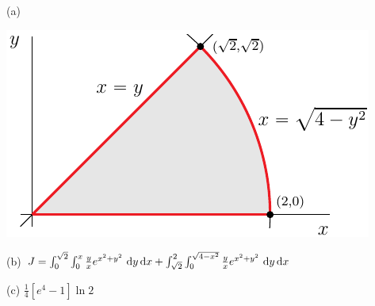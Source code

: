%

\begin{answer}
(a)
\begin{center}
     \includegraphics{fig/OE11A_6.pdf}
\end{center}

(b) $J = \int_0^{\sqrt{2}}\int_0^x \frac{y}{x}  e^{x^2+y^2}\ \dee{y}\,\dee{x}
   + \int_{\sqrt{2}}^2\int_0^{\sqrt{4-x^2}} \frac{y}{x}  e^{x^2+y^2}\ 
                                                    \dee{y}\,\dee{x}
    $

(c) $\frac{1}{4}\left[e^4-1\right]\ln 2$
\end{answer}


